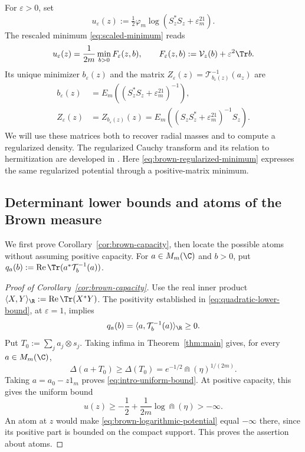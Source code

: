 For $\varepsilon>0$, set
\begin{equation}\label{eq:spectral-potential}
 u_\varepsilon(z):=\tfrac12\varphi_m
                   \log(S_z^*S_z+\varepsilon^21_m).
\end{equation}
The rescaled minimum \eqref{eq:scaled-minimum} reads
\begin{equation}\label{eq:brown-regularized-minimum}
 u_\varepsilon(z)=\frac1{2m}\min_{b>0}F_\varepsilon(z,b),
 \qquad F_\varepsilon(z,b):=\mathcal V_z(b)+\varepsilon^2\Tr b.
\end{equation}
Its unique minimizer $b_\varepsilon(z)$ and the matrix $Z_\varepsilon(z)=\mathcal T_{b_\varepsilon(z)}^{-1}(a_z)$ are
\begin{equation}\label{eq:brown-regularized-optimizer}
 \begin{split}
 b_\varepsilon(z)&=E_m((S_z^*S_z+\varepsilon^21_m)^{-1}),\\
 Z_\varepsilon(z)&=Z_{b_\varepsilon(z)}(z)
     =E_m((S_zS_z^*+\varepsilon^21_m)^{-1}S_z).
 \end{split}
\end{equation}
We will use these matrices both to recover radial masses and to compute a regularized density.
The regularized Cauchy transform and its relation to hermitization are developed in \cite[arXiv version, Sections~2.1.6 and~2.2]{BSS18}.
Here \eqref{eq:brown-regularized-minimum} expresses the same regularized potential through a positive-matrix minimum.

\subsection{Determinant lower bounds and atoms of the Brown measure}
\label{subsec:brown-atoms}
We first prove Corollary~\ref{cor:brown-capacity}, then locate the possible atoms without assuming positive capacity.
For $a\in M_m(\C)$ and $b>0$, put $q_a(b):=\operatorname{Re}\Tr(a^*\mathcal T_b^{-1}(a))$.

\begin{proof}[Proof of Corollary~\ref{cor:brown-capacity}]
Use the real inner product $\langle X,Y\rangle_{\R}:=\operatorname{Re}\Tr(X^*Y)$.
The positivity established in \eqref{eq:quadratic-lower-bound}, at $\varepsilon=1$, implies
\[
 q_a(b)=\langle a,\mathcal T_b^{-1}(a)\rangle_{\R}\ge0.
\]
Put $T_0:=\sum_j a_j\otimes s_j$.
Taking infima in Theorem~\ref{thm:main} gives, for every $a\in M_m(\C)$,
\begin{equation}\label{eq:brown-capacity-lower-bound}
 \Delta(a+T_0)\ge\Delta(T_0)
               =e^{-1/2}\Cap(\eta)^{1/(2m)}.
\end{equation}
Taking $a=a_0-z1_m$ proves \eqref{eq:intro-uniform-bound}.
At positive capacity, this gives the uniform bound
\[
 u(z)\ge -\frac12+\frac1{2m}\log\Cap(\eta)>-\infty.
\]
An atom at $z$ would make \eqref{eq:brown-logarithmic-potential} equal $-\infty$ there, since its positive part is bounded on the compact support.
This proves the assertion about atoms.
\end{proof}

